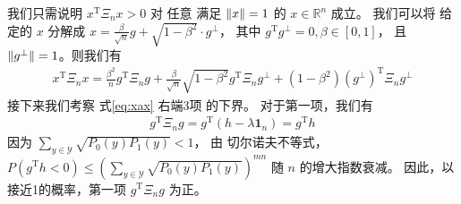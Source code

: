 我们只需说明 $x^{\mathrm{T}} \Xi_n x>0$ 对 任意 满足 $\lVert x\rVert=1$ 的 $x \in \mathbb{R}^n$ 成立。
我们可以将 给定的 $x$ 分解成 $x=\frac{\beta}{\sqrt{n}} g
+ \sqrt{1-\beta^2}\cdot g^{\perp}$， 其中 $g^{\mathrm{T}}g^{\perp}=0, \beta \in [0,1]$，
且 $\lVert g^{\perp}\rVert=1$。则我们有 
\begin{align}\label{eq:xax}
    x^{\mathrm{T}} \Xi_n x = \frac{\beta^2}{n} g^{\mathrm{T}} \Xi_n g  
    +		\frac{\beta}{\sqrt{n}}\sqrt{1-\beta^2} g^{\mathrm{T}} \Xi_n g^{\perp}
    +
    (1-\beta^2)(g^{\perp})^{\mathrm{T}} \Xi_n g^{\perp}
\end{align}
接下来我们考察 式\eqref{eq:xax} 右端3项
的下界。
对于第一项，我们有
\begin{align*}
    g^{\mathrm{T}} \Xi_n g = g^{\mathrm{T}}(h -\lambda \mathbf{1}_n)   = g^{\mathrm{T}} h
\end{align*}
因为 $\sum_{y \in \mathcal{Y}} \sqrt{P_0(y)P_1(y)} < 1$，
由 切尔诺夫不等式， 
$P(g^{\mathrm{T}} h < 0) \leq (\sum_{y \in \mathcal{Y}} \sqrt{P_0(y)P_1(y)})^{mn}$
随 $n$ 的增大指数衰减。
因此，以接近1的概率，第一项 $g^{\mathrm{T}} \Xi_n g$ 为正。

